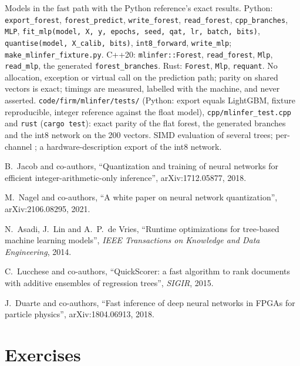 \begin{build}
 Models in the fast path with the Python reference's exact results.
 Python: \texttt{export\_forest}, \texttt{forest\_predict}, \texttt{write\_forest}, \texttt{read\_forest},
\texttt{cpp\_branches}, \texttt{MLP}, \texttt{fit\_mlp(model, X, y, epochs, seed, qat, lr, batch, bits)}, \texttt{quantise(model,
X\_calib, bits)}, \texttt{int8\_forward}, \texttt{write\_mlp}; \texttt{make\_mlinfer\_fixture.py}. C++20: \texttt{mlinfer::Forest},
\texttt{read\_forest}, \texttt{Mlp}, \texttt{read\_mlp}, the generated \texttt{forest\_branches}. Rust: \texttt{Forest},
\texttt{Mlp}, \texttt{requant}.
 No allocation, exception or virtual call on the prediction path; parity on shared vectors is exact; timings are
measured, labelled with the machine, and never asserted.
 \texttt{code/firm/mlinfer/tests/} (Python: export equals LightGBM, fixture reproducible, integer
reference against the float model), \texttt{cpp/mlinfer\_test.cpp} and \texttt{rust} (\texttt{cargo test}): exact parity of the
flat forest, the generated branches and the int8 network on the 200 vectors.
 SIMD evaluation of several trees; per-channel ; a hardware-description export of the int8 network.
\end{build}

\begin{omsources}
\item B.~Jacob and co-authors, ``Quantization and training of neural networks for efficient integer-arithmetic-only
inference'', arXiv:1712.05877, 2018.
\item M.~Nagel and co-authors, ``A white paper on neural network quantization'', arXiv:2106.08295, 2021.
\item N.~Asadi, J.~Lin and A.~P.~de Vries, ``Runtime optimizations for tree-based machine learning models'', \emph{IEEE
Transactions on Knowledge and Data Engineering}, 2014.
\item C.~Lucchese and co-authors, ``QuickScorer: a fast algorithm to rank documents with additive ensembles of regression
trees'', \emph{SIGIR}, 2015.
\item J.~Duarte and co-authors, ``Fast inference of deep neural networks in FPGAs for particle physics'', arXiv:1804.06913,
2018.
\end{omsources}

\section{Exercises}

